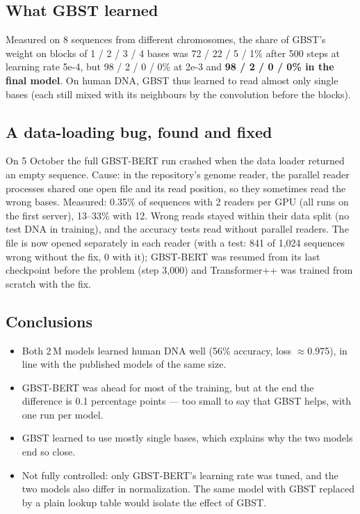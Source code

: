 \documentclass[11pt,a4paper]{article}
\begin{document}
\subsection*{What GBST learned}
Measured on 8 sequences from different chromosomes, the share of GBST's weight on blocks of
1 / 2 / 3 / 4 bases was 72 / 22 / 5 / 1\% after 500 steps at learning rate 5e-4, but
98 / 2 / 0 / 0\% at 2e-3 and \textbf{98 / 2 / 0 / 0\% in the final model}. On human DNA, GBST thus
learned to read almost only single bases (each still mixed with its neighbours by the
convolution before the blocks).

\subsection*{A data-loading bug, found and fixed}
On 5 October the full GBST-BERT run crashed when the data loader returned an empty sequence.
Cause: in the repository's genome reader, the parallel reader processes shared one open file and
its read position, so they sometimes read the wrong bases. Measured: 0.35\% of sequences with 2
readers per GPU (all runs on the first server), 13--33\% with 12. Wrong reads stayed within their
data split (no test DNA in training), and the accuracy tests read without parallel readers. The
file is now opened separately in each reader (with a test: 841 of 1,024 sequences wrong without the
fix, 0 with it); GBST-BERT was resumed from its last checkpoint before the problem (step 3,000) and
Transformer++ was trained from scratch with the fix.

\subsection*{Conclusions}
\begin{itemize}
\item Both 2\,M models learned human DNA well (56\% accuracy, loss $\approx$0.975), in line with
  the published models of the same size.
\item GBST-BERT was ahead for most of the training, but at the end the difference is 0.1
  percentage points --- too small to say that GBST helps, with one run per model.
\item GBST learned to use mostly single bases, which explains why the two models end so close.
\item Not fully controlled: only GBST-BERT's learning rate was tuned, and the two models also
  differ in normalization. The same model with GBST replaced by a plain lookup table would
  isolate the effect of GBST.
\end{itemize}
\end{document}
